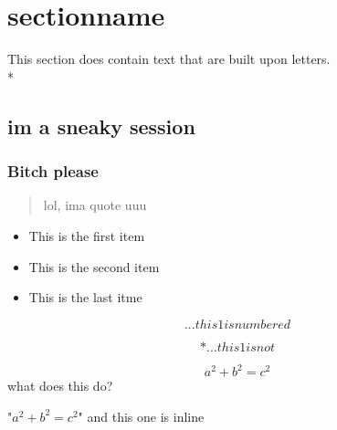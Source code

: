 \documentclass[twocolumn]{article}
\begin{document}
	
	
	\section{sectionname}
		This section does contain text %
		that are built upon letters.\\*

		\subsection{im a sneaky session}
			\subsubsection{Bitch please}
			
			\begin{quote} lol, ima quote uuu \end{quote}

			\begin{itemize}
			\item This is the first item
			\item This is the second item
			\item This is the last itme
			\end{itemize}

			\begin{equation} ...this 1 is numbered \end{equation}
			
			\begin{equation}* ...this 1 is not \end{equation}
			
				\[
				a^2 + b^2 = c^2
				\] what does this do?
				
				"$a^2+b^2=c^2$" and this one is inline
		
\end{document}
